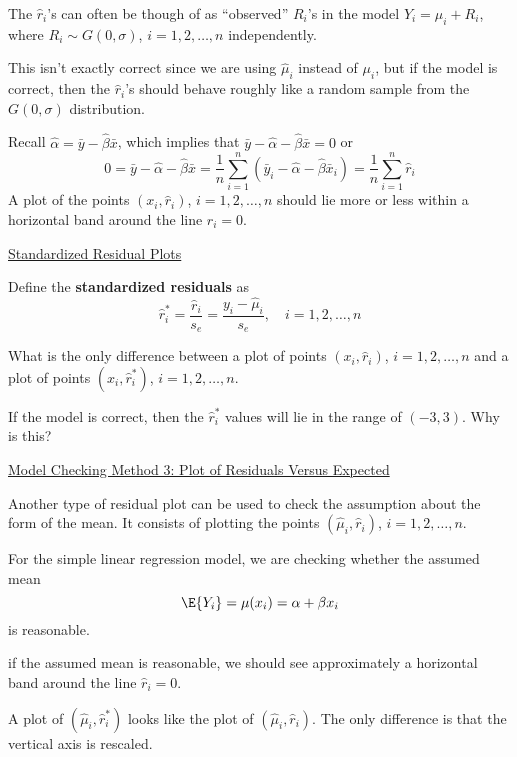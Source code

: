 The $ \hat{r}_i $'s can often be though of as ``observed'' $ R_i $'s in the model $ Y_i=\mu_i+R_i $,
where $ R_i\sim G(0,\sigma) $, $ i=1,2,\ldots ,n $ independently.

This isn't exactly correct since we are using $ \hat{\mu}_i $ instead of $ \mu_i $,
but if the model is correct, then the $ \hat{r}_i $'s should behave roughly like a random
sample from the $ G(0,\sigma) $ distribution.

Recall $ \hat{\alpha}=\bar{y}-\hat{\beta}\bar{x} $, which implies that $ \bar{y}-\hat{\alpha}-\hat{\beta}\bar{x}=0 $
or
\[ 0=\bar{y}-\hat{\alpha}-\hat{\beta}\bar{x}=\frac{1}{n} \sum\limits_{i=1}^{n} \left( \bar{y}_i-\hat{\alpha}-\hat{\beta}\bar{x}_i \right)
    =\frac{1}{n} \sum\limits_{i=1}^{n} \hat{r}_i \]
A plot of the points $ \left( x_i,\hat{r}_i \right) $, $ i=1,2,\ldots ,n $
should lie more or less within a horizontal band around the line $ \hat{r}_i=0 $.

\underline{Standardized Residual Plots}

\begin{Definition}{}{}
    Define the \textbf{standardized residuals} as
    \[\hat{r}_{i}^{*}=\frac{\hat{r}_{i}}{s_{e}}=\frac{y_{i}-\hat{\mu}_{i}}{s_{e}}, \quad i=1,2, \ldots, n\]
\end{Definition}

What is the only difference between a plot of points $ \left( x_i,\hat{r}_i \right) $, $ i=1,2,\ldots ,n $
and a plot of points $ \left( x_i,\hat{r}_i^* \right) $, $ i=1,2,\ldots ,n $.

If the model is correct, then the $ \hat{r}_i^* $ values will lie in the range of $ (-3,3) $. Why is this?

\underline{Model Checking Method 3: Plot of Residuals Versus Expected}

Another type of residual plot can be used to check the assumption about the form of the mean.
It consists of plotting the points $ \left( \hat{\mu}_i,\hat{r}_i \right) $, $ i=1,2,\ldots ,n $.

For the simple linear regression model, we are checking whether the assumed mean
\[ \E{Y_i}=\mu(x_i)=\alpha+\beta x_i \]
is reasonable.

if the assumed mean is reasonable, we should see approximately a horizontal band around the line
$ \hat{r}_i=0 $.

A plot of $ \left( \hat{\mu}_i,\hat{r}_i^* \right) $ looks like the plot of $ \left( \hat{\mu}_i,\hat{r}_i \right) $.
The only difference is that the vertical axis is rescaled.

